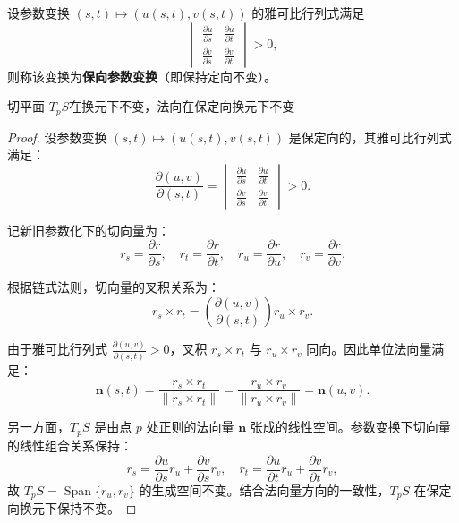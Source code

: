 \documentclass[lang=cn,10pt,thmcnt=section]{elegantbook}
\begin{document}
\begin{remark}
    设参数变换 $(s,t) \mapsto (u(s,t), v(s,t))$ 的雅可比行列式满足
\[
\begin{vmatrix}
\frac{\partial u}{\partial s} & \frac{\partial u}{\partial t} \\
\frac{\partial v}{\partial s} & \frac{\partial v}{\partial t}
\end{vmatrix} > 0,
\]
则称该变换为\textbf{保向参数变换}（即保持定向不变）。
\end{remark}
\begin{proposition}
    切平面 $T_p S$在换元下不变，法向在保定向换元下不变
\end{proposition}
\begin{proof}
    设参数变换 \((s,t) \mapsto (u(s,t), v(s,t))\) 是保定向的，其雅可比行列式满足：
    \[
    \frac{\partial(u,v)}{\partial(s,t)} = 
    \begin{vmatrix}
    \frac{\partial u}{\partial s} & \frac{\partial u}{\partial t} \\
    \frac{\partial v}{\partial s} & \frac{\partial v}{\partial t}
    \end{vmatrix} > 0.
    \]
    
    记新旧参数化下的切向量为：
    \[
    r_s = \frac{\partial r}{\partial s}, \quad r_t = \frac{\partial r}{\partial t}, \quad r_u = \frac{\partial r}{\partial u}, \quad r_v = \frac{\partial r}{\partial v}.
    \]
    
    根据链式法则，切向量的叉积关系为：
    \[
    r_s \times r_t = \left( \frac{\partial(u,v)}{\partial(s,t)} \right) r_u \times r_v.
    \]
    
    由于雅可比行列式 \(\frac{\partial(u,v)}{\partial(s,t)} > 0\)，叉积 \( r_s \times r_t \) 与 \( r_u \times r_v \) 同向。因此单位法向量满足：
    \[
    \mathbf{n}(s,t) = \frac{r_s \times r_t}{\lVert r_s \times r_t \rVert} = \frac{r_u \times r_v}{\lVert r_u \times r_v \rVert} = \mathbf{n}(u,v).
    \]
    
    另一方面，\( T_p S \) 是由点 \( p \) 处正则的法向量 \(\mathbf{n}\) 张成的线性空间。参数变换下切向量的线性组合关系保持：
    \[
    r_s = \frac{\partial u}{\partial s} r_u + \frac{\partial v}{\partial s} r_v, \quad r_t = \frac{\partial u}{\partial t} r_u + \frac{\partial v}{\partial t} r_v,
    \]
    故 \( T_p S = \operatorname{Span}\{ r_u, r_v \} \) 的生成空间不变。结合法向量方向的一致性，\( T_p S \) 在保定向换元下保持不变。
\end{proof}
\end{document}
